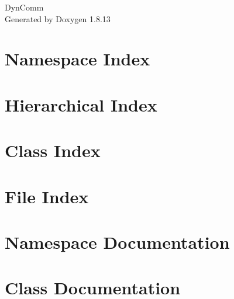 \documentclass[twoside]{book}
\newcommand{\+}{\discretionary{\mbox{\scriptsize$\hookleftarrow$}}{}{}}
\newcommand{\clearemptydoublepage}{%
  \newpage{\pagestyle{empty}\cleardoublepage}%
}
\begin{document}
\hypersetup{pageanchor=false,
             bookmarksnumbered=true,
             pdfencoding=unicode
            }
\begin{titlepage}
\vspace*{7cm}
\begin{center}%
{\Large Dyn\+Comm }\\
\vspace*{1cm}
{\large Generated by Doxygen 1.8.13}\\
\end{center}
\end{titlepage}
\clearemptydoublepage
{}
\tableofcontents
\clearemptydoublepage
{}
\hypersetup{pageanchor=true}

\chapter{Namespace Index}

\chapter{Hierarchical Index}

\chapter{Class Index}

\chapter{File Index}

\chapter{Namespace Documentation}





\chapter{Class Documentation}


































\end{document}
